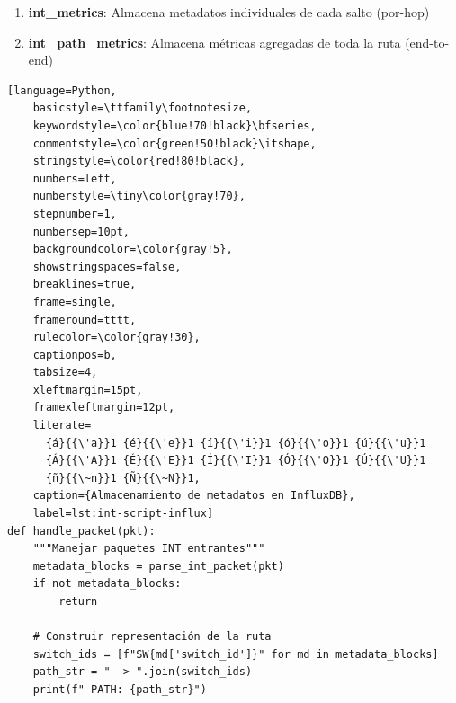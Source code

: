 \begin{enumerate}
    \item \textbf{int\_metrics}: Almacena metadatos individuales de cada salto (por-hop)
    \item \textbf{int\_path\_metrics}: Almacena métricas agregadas de toda la ruta (end-to-end)
\end{enumerate}

\begin{lstlisting}[language=Python,
    basicstyle=\ttfamily\footnotesize,
    keywordstyle=\color{blue!70!black}\bfseries,
    commentstyle=\color{green!50!black}\itshape,
    stringstyle=\color{red!80!black},
    numbers=left,
    numberstyle=\tiny\color{gray!70},
    stepnumber=1,
    numbersep=10pt,
    backgroundcolor=\color{gray!5},
    showstringspaces=false,
    breaklines=true,
    frame=single,
    frameround=tttt,
    rulecolor=\color{gray!30},
    captionpos=b,
    tabsize=4,
    xleftmargin=15pt,
    framexleftmargin=12pt,
    literate=
      {á}{{\'a}}1 {é}{{\'e}}1 {í}{{\'i}}1 {ó}{{\'o}}1 {ú}{{\'u}}1
      {Á}{{\'A}}1 {É}{{\'E}}1 {Í}{{\'I}}1 {Ó}{{\'O}}1 {Ú}{{\'U}}1
      {ñ}{{\~n}}1 {Ñ}{{\~N}}1,
    caption={Almacenamiento de metadatos en InfluxDB}, 
    label=lst:int-script-influx]
def handle_packet(pkt):
    """Manejar paquetes INT entrantes"""
    metadata_blocks = parse_int_packet(pkt)
    if not metadata_blocks:
        return
    
    # Construir representación de la ruta
    switch_ids = [f"SW{md['switch_id']}" for md in metadata_blocks]
    path_str = " -> ".join(switch_ids)
    print(f" PATH: {path_str}")
    

\end{lstlisting}
